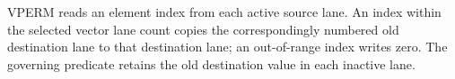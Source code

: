 VPERM reads an element index from each active source lane.  An index within the
selected vector lane count copies the correspondingly numbered old destination
lane to that destination lane; an out-of-range index writes zero.  The
governing predicate retains the old destination value in each inactive lane.
